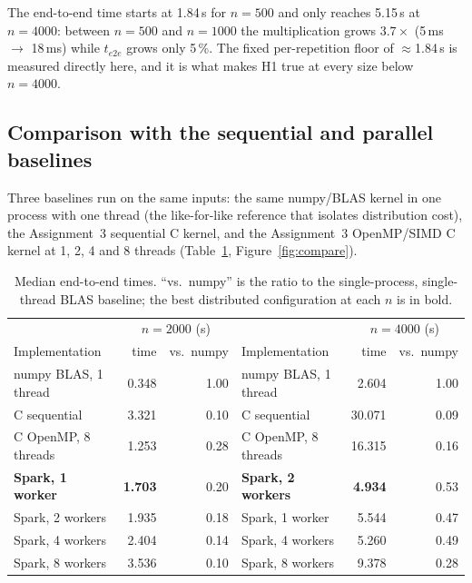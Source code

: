 \documentclass[11pt,a4paper]{article}
\begin{document}
The end-to-end time starts at 1.84\,s for $n=500$ and only reaches
5.15\,s at $n=4000$: between $n=500$ and $n=1000$ the multiplication
grows $3.7\times$ (5\,ms $\rightarrow$ 18\,ms) while $t_{e2e}$ grows
only 5\,\%. The fixed per-repetition floor of $\approx$1.84\,s is
measured directly here, and it is what makes H1 true at every size
below $n=4000$.

\subsection{Comparison with the sequential and parallel baselines}

Three baselines run on the same inputs: the same numpy/BLAS kernel in
one process with one thread (the like-for-like reference that isolates
distribution cost), the Assignment~3 sequential C kernel, and the
Assignment~3 OpenMP/SIMD C kernel at 1, 2, 4 and 8 threads
(Table~\ref{tab:compare}, Figure~\ref{fig:compare}).

\begin{table}[h!]
\centering
\small
\setlength{\tabcolsep}{4pt}
\begin{tabular}{lrr|lrr}
\toprule
 & \multicolumn{2}{c|}{$n=2000$ (s)} & & \multicolumn{2}{c}{$n=4000$ (s)} \\
Implementation & time & vs.\ numpy & Implementation & time & vs.\ numpy \\
\midrule
numpy BLAS, 1 thread   & 0.348 & 1.00 & numpy BLAS, 1 thread   & 2.604 & 1.00 \\
C sequential           & 3.321 & 0.10 & C sequential           & 30.071 & 0.09 \\
C OpenMP, 8 threads    & 1.253 & 0.28 & C OpenMP, 8 threads    & 16.315 & 0.16 \\
\textbf{Spark, 1 worker}   & \textbf{1.703} & 0.20 & \textbf{Spark, 2 workers}
    & \textbf{4.934} & 0.53 \\
Spark, 2 workers       & 1.935 & 0.18 & Spark, 1 worker        & 5.544 & 0.47 \\
Spark, 4 workers       & 2.404 & 0.14 & Spark, 4 workers       & 5.260 & 0.49 \\
Spark, 8 workers       & 3.536 & 0.10 & Spark, 8 workers       & 9.378 & 0.28 \\
\bottomrule
\end{tabular}
\caption{Median end-to-end times. ``vs.\ numpy'' is the ratio to the
single-process, single-thread BLAS baseline; the best distributed
configuration at each $n$ is in bold.}
\label{tab:compare}
\end{table}
\end{document}
